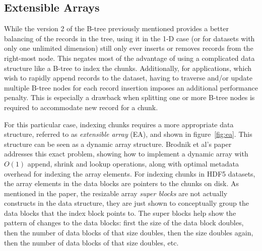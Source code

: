 \subsection{Extensible Arrays}

While the version 2 of the B-tree previously mentioned provides a better
balancing of the records in the tree, using it in the 1-D case (or for
datasets with only one unlimited dimension) still only ever inserts or removes
records from the right-most node.
This negates most of the advantage of using a complicated data structure like a
B-tree to index the chunks.
Additionally, for applications, which wish to rapidly append records to the 
dataset, having to traverse and/or update multiple B-tree nodes for each 
record insertion imposes an additional performance penalty. This is 
especially a drawback when splitting one or more B-tree nodes is required to 
accommodate new record for a chunk.

\begin{figure*}
\centering

\caption{Simplified version of extensible array structure used for indexing chunks.}
\label{fig:ea}
\end{figure*}

For this particular case, indexing chunks requires a more appropriate data
structure, referred to as \textit{extensible array} (EA), and shown in
figure~\ref{fig:ea}. This structure can be seen as a dynamic array structure.
Brodnik et al's paper~\cite{Brodnik1999} addresses this exact problem,
showing how to implement a dynamic array with $O(1)$ append, shrink and lookup
operations, along with optimal metadata overhead for indexing the array elements.
For indexing chunks in HDF5 datasets, the array elements in the data blocks are
pointers to the chunks on disk.
As mentioned in the paper, the resizable array \textit{super blocks} are not actually 
constructs in the data structure, they are just shown to conceptually group the data 
blocks that the index block points to. The super blocks help show the pattern of 
changes to the data blocks: first the size of the data block doubles, then the 
number of data blocks of that size doubles, then the size doubles again, then the 
number of data blocks of that size doubles, etc.

